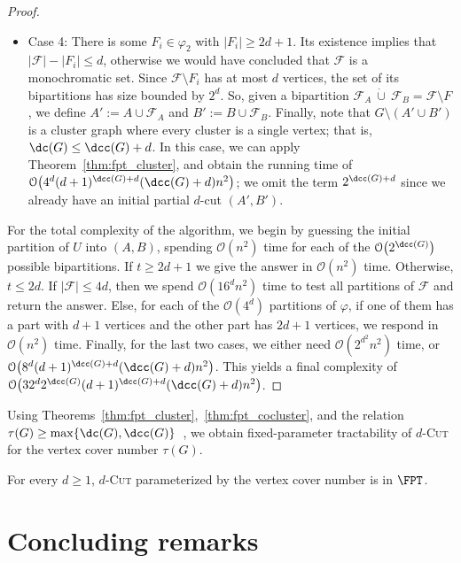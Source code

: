 \documentclass[a4paper,UKenglish,cleveref, autoref]{lipics-v2019}
\newcommand{\bigO}[1]{\mathcal{O}\!\left(#1\right)}
\newcommand{\dcup}{\ \dot\cup\ }
\newcommand{\pname}[1]{\textsc{#1}}
\begin{document}
\begin{proof}
\begin{itemize}
        \item Case 4: There is some $F_i \in \varphi_2$ with $|F_i| \geq 2d + 1$.
        Its existence implies that $|\mathcal{F}| - |F_i| \leq d$, otherwise we would have concluded that $\mathcal{F}$ is a monochromatic set.
        Since $\mathcal{F} \setminus F_i$ has at most $d$ vertices, the set of its bipartitions has size bounded by $2^d$.
        So, given a bipartition $\mathcal{F}_A \dcup \mathcal{F}_B = \mathcal{F} \setminus F$, we define $A' := A \cup \mathcal{F}_A$ and $B' := B \cup \mathcal{F}_B$.
        Finally, note that $G \setminus (A' \cup B')$ is a cluster graph where every cluster is a single vertex; that is, $\dc(G) \leq \dcc(G) + d$.
        In this case, we can apply Theorem~\ref{thm:fpt_cluster}, and obtain the running time of $\bigO{4^d(d+1)^{\dcc(G)+d}(\dcc(G)+d)n^2}$; we omit the term $2^{\dcc(G) + d}$ since we already have an initial partial $d$-cut $(A', B')$.
    \end{itemize}

    For the total complexity of the algorithm, we begin by guessing the initial partition of $U$ into $(A,B)$, spending $\bigO{n^2}$ time for each of the $\bigO{2^{\dcc(G)}}$ possible bipartitions.
    If $t \geq 2d+1$ we give the answer in $\bigO{n^2}$ time.
    Otherwise, $t \leq 2d$.
    If $|\mathcal{F}| \leq 4d$, then we spend $\bigO{16^dn^2}$ time to test all partitions of $\mathcal{F}$ and return the answer.
    Else, for each of the $\bigO{4^d}$ partitions of $\varphi$, if one of them has a part with $d+1$ vertices and the other part has $2d+1$ vertices, we respond in $\bigO{n^2}$ time.
    Finally, for the last two cases, we either need $\bigO{2^{d^2}n^2}$ time, or $\bigO{8^d(d+1)^{\dcc(G)+d}(\dcc(G)+d)n^2}$.
    This yields a final complexity of $\bigO{32^d2^{\dcc(G)}(d+1)^{\dcc(G)+d}(\dcc(G)+d)n^2}$.
\end{proof}

Using Theorems~\ref{thm:fpt_cluster},~\ref{thm:fpt_cocluster}, and the relation $\tau(G) \geq \max\{\dc(G), \dcc(G)\}$~\cite{matching_cut_ipec}, we obtain fixed-parameter tractability of \pname{$d$-Cut} for the vertex cover number $\tau(G)$.

\begin{corollary}
    For every $d \geq 1$, \pname{$d$-Cut} parameterized by the vertex cover number is in $\FPT$.
\end{corollary}

\section{Concluding remarks}
\label{sec:concl}
\end{document}
